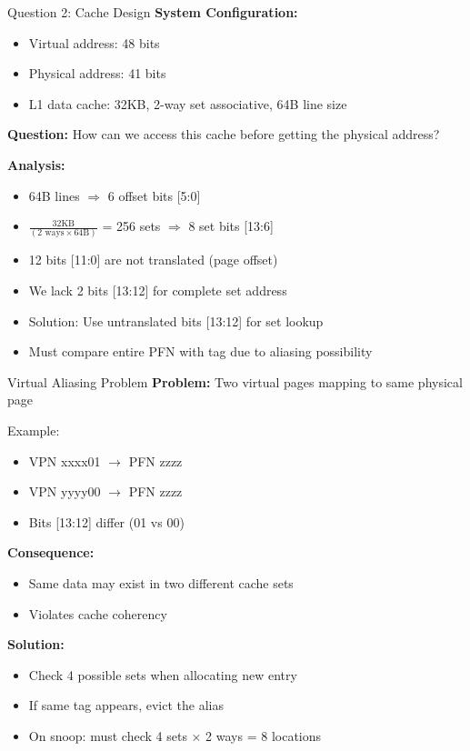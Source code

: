 \documentclass[aspectratio=169,12pt]{beamer}
\begin{document}
\begin{frame}{Question 2: Cache Design}
\textbf{System Configuration:}
\begin{itemize}
    \item Virtual address: 48 bits
    \item Physical address: 41 bits
    \item L1 data cache: 32KB, 2-way set associative, 64B line size
\end{itemize}

\vspace{1em}
\textbf{Question:} How can we access this cache before getting the physical address?

\vspace{1em}
\textbf{Analysis:}
\begin{itemize}
    \item 64B lines $\Rightarrow$ 6 offset bits [5:0]
    \item $\frac{32\text{KB}}{(2\text{ ways} \times 64\text{B})}$ = 256 sets $\Rightarrow$ 8 set bits [13:6]
    \item 12 bits [11:0] are not translated (page offset)
    \item We lack 2 bits [13:12] for complete set address
    \item Solution: Use untranslated bits [13:12] for set lookup
    \item Must compare entire PFN with tag due to aliasing possibility
\end{itemize}
\end{frame}

\begin{frame}{Virtual Aliasing Problem}
\textbf{Problem:} Two virtual pages mapping to same physical page

\vspace{1em}
Example:
\begin{itemize}
    \item VPN xxxx01 $\rightarrow$ PFN zzzz
    \item VPN yyyy00 $\rightarrow$ PFN zzzz
    \item Bits [13:12] differ (01 vs 00)
\end{itemize}

\vspace{1em}
\textbf{Consequence:}
\begin{itemize}
    \item Same data may exist in two different cache sets
    \item Violates cache coherency
\end{itemize}

\vspace{1em}
\textbf{Solution:}
\begin{itemize}
    \item Check 4 possible sets when allocating new entry
    \item If same tag appears, evict the alias
    \item On snoop: must check 4 sets × 2 ways = 8 locations
\end{itemize}
\end{frame}
\end{document}
